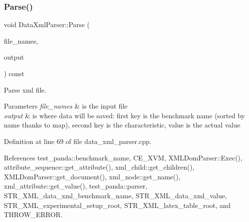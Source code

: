 \subsubsection{\texorpdfstring{Parse()}{Parse()}}
{\footnotesize\ttfamily void Data\+Xml\+Parser\+::\+Parse (\begin{DoxyParamCaption}\item[{const \hyperlink{custom__set_8hpp_a615bc2f42fc38a4bb1790d12c759e86f}{Custom\+Set}$<$ std\+::string $>$ \&}]{file\+\_\+names,  }\item[{std\+::map$<$ std\+::string, \hyperlink{custom__map_8hpp_a18ca01763abbe3e5623223bfe5aaac6b}{Custom\+Map}$<$ std\+::string, std\+::string $>$$>$ \&}]{output }\end{DoxyParamCaption}) const}



Parse xml file. 


\begin{DoxyParams}{Parameters}
{\em file\+\_\+names} & is the input file \\
\hline
{\em output} & is where data will be saved\+: first key is the benchmark name (sorted by name thanks to map), second key is the characteristic, value is the actual value \\
\hline
\end{DoxyParams}


Definition at line 69 of file data\+\_\+xml\+\_\+parser.\+cpp.



References test\+\_\+panda\+::benchmark\+\_\+name, C\+E\+\_\+\+X\+VM, X\+M\+L\+Dom\+Parser\+::\+Exec(), attribute\+\_\+sequence\+::get\+\_\+attribute(), xml\+\_\+child\+::get\+\_\+children(), X\+M\+L\+Dom\+Parser\+::get\+\_\+document(), xml\+\_\+node\+::get\+\_\+name(), xml\+\_\+attribute\+::get\+\_\+value(), test\+\_\+panda\+::parser, S\+T\+R\+\_\+\+X\+M\+L\+\_\+data\+\_\+xml\+\_\+benchmark\+\_\+name, S\+T\+R\+\_\+\+X\+M\+L\+\_\+data\+\_\+xml\+\_\+value, S\+T\+R\+\_\+\+X\+M\+L\+\_\+experimental\+\_\+setup\+\_\+root, S\+T\+R\+\_\+\+X\+M\+L\+\_\+latex\+\_\+table\+\_\+root, and T\+H\+R\+O\+W\+\_\+\+E\+R\+R\+OR.

